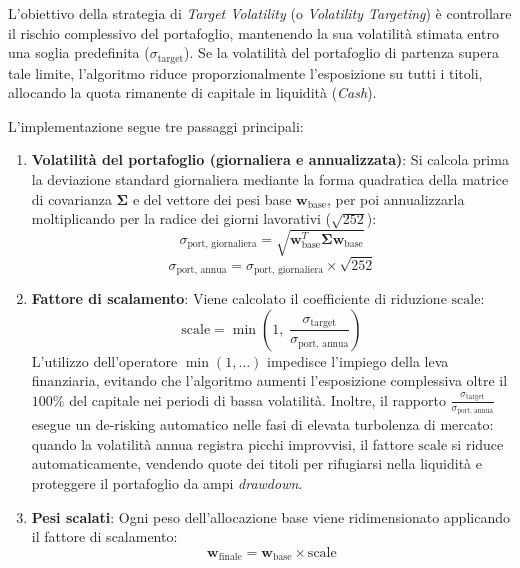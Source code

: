 L'obiettivo della strategia di \textit{Target Volatility} (o \textit{Volatility Targeting}) è controllare il rischio complessivo del portafoglio, mantenendo la sua volatilità stimata entro una soglia predefinita ($\sigma_{\text{target}}$). Se la volatilità del portafoglio di partenza supera tale limite, l'algoritmo riduce proporzionalmente l'esposizione su tutti i titoli, allocando la quota rimanente di capitale in liquidità (\textit{Cash}).

L'implementazione segue tre passaggi principali:

\begin{enumerate}
    \item \textbf{Volatilità del portafoglio (giornaliera e annualizzata)}: Si calcola prima la deviazione standard giornaliera mediante la forma quadratica della matrice di covarianza $\mathbf{\Sigma}$ e del vettore dei pesi base $\mathbf{w}_{\text{base}}$, per poi annualizzarla moltiplicando per la radice dei giorni lavorativi ($\sqrt{252}$):
    \begin{equation}
        \sigma_{\text{port, giornaliera}} = \sqrt{\mathbf{w}_{\text{base}}^T \mathbf{\Sigma} \mathbf{w}_{\text{base}}}
    \end{equation}
    \begin{equation}
        \sigma_{\text{port, annua}} = \sigma_{\text{port, giornaliera}} \times \sqrt{252}
    \end{equation}

    \item \textbf{Fattore di scalamento}: Viene calcolato il coefficiente di riduzione $\text{scale}$:
    \begin{equation}
        \text{scale} = \min\left(1, \; \frac{\sigma_{\text{target}}}{\sigma_{\text{port, annua}}}\right)
    \end{equation}
    L'utilizzo dell'operatore $\min(1, \dots)$ impedisce l'impiego della leva finanziaria, evitando che l'algoritmo aumenti l'esposizione complessiva oltre il $100\%$ del capitale nei periodi di bassa volatilità. Inoltre, il rapporto $\frac{\sigma_{\text{target}}}{\sigma_{\text{port, annua}}}$ esegue un de-risking automatico nelle fasi di elevata turbolenza di mercato: quando la volatilità annua registra picchi improvvisi, il fattore $\text{scale}$ si riduce automaticamente, vendendo quote dei titoli per rifugiarsi nella liquidità e proteggere il portafoglio da ampi \textit{drawdown}.

    \item \textbf{Pesi scalati}: Ogni peso dell'allocazione base viene ridimensionato applicando il fattore di scalamento:
    \begin{equation}
        \mathbf{w}_{\text{finale}} = \mathbf{w}_{\text{base}} \times \text{scale}
    \end{equation}
\end{enumerate}


